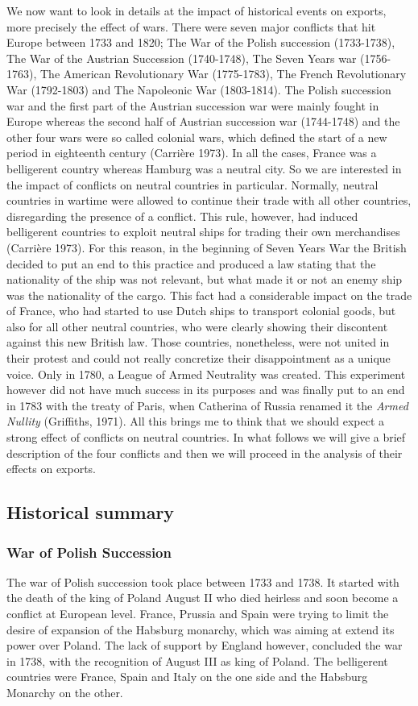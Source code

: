 \documentclass[12pt,a4paper,titlepage,english]{article}
\begin{document}
We now want to look in details at the impact of historical events on exports, more precisely the effect of wars. There were seven major conflicts that hit Europe between 1733 and 1820; The War of the Polish succession (1733-1738), The War of the Austrian Succession (1740-1748), The Seven Years war (1756-1763), The American Revolutionary War (1775-1783), The French Revolutionary War (1792-1803) and The Napoleonic War (1803-1814). The Polish succession war and the first part of the Austrian succession war were mainly fought in Europe whereas the second half of Austrian succession war (1744-1748) and the other four wars were so called colonial wars, which defined the start of a new period in eighteenth century (Carrière 1973). In all the cases, France was a belligerent country whereas Hamburg was a neutral city. So we are interested in the impact of conflicts on neutral countries in particular. Normally, neutral countries in wartime were allowed to continue their trade with all other countries, disregarding the presence of a conflict.  This rule, however, had induced belligerent countries to exploit neutral ships for trading their own merchandises (Carrière 1973). For this reason, in the beginning of Seven Years War the British decided to put an end to this practice and produced a law stating that the nationality of the ship was not relevant, but what made it or not an enemy ship was the nationality of the cargo. This fact had a considerable impact on the trade of France, who had started to use Dutch ships to transport colonial goods, but also for all other neutral countries, who were clearly showing their discontent against this new British law. Those countries, nonetheless, were not united in their protest and could not really concretize their disappointment as a unique voice. Only in 1780, a League of Armed Neutrality was created. This experiment however did not have much success in its purposes and was finally put to an end in 1783 with the treaty of Paris, when Catherina of Russia renamed it the \textit{Armed Nullity} (Griffiths, 1971). 
All this brings me to think that we should expect a strong effect of conflicts on neutral countries. 
In what follows we will give a brief description of the four conflicts and then we will proceed in the analysis of their effects on exports. 

\subsection{Historical summary}
\subsubsection{War of Polish Succession}
The war of Polish succession took place between 1733 and 1738. It started with the death of the king of Poland August II who died heirless and soon become a conflict at European level. France, Prussia and Spain were trying to limit the desire of expansion of the Habsburg monarchy, which was aiming at extend its power over Poland. The lack of support by England however, concluded the war in 1738, with the recognition of August III as king of Poland. The belligerent countries were France, Spain and Italy on the one side and the Habsburg Monarchy on the other. 
\end{document}
